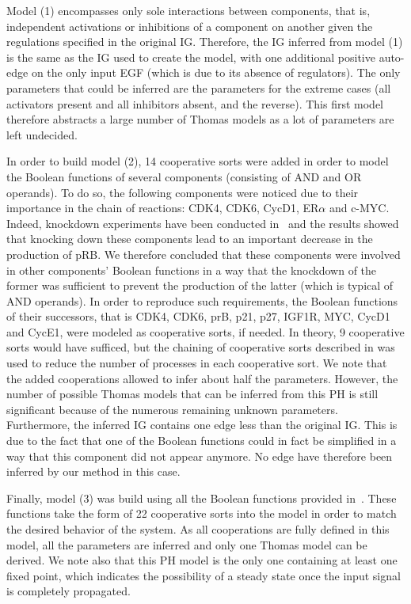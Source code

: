 Model (1) encompasses only sole interactions between components, that is,
independent activations or inhibitions of a component on another given the regulations specified in the original IG.
Therefore, the IG inferred from model (1) is the same as the IG used to create the model,
with one additional positive auto-edge on the only input EGF (which is due to its absence of regulators).
The only parameters that could be inferred are the parameters for the extreme cases
(all activators present and all inhibitors absent, and the reverse).
This first model therefore abstracts a large number of Thomas models as a lot of parameters are left undecided.

In order to build model (2), 14 cooperative sorts were added in order to model the Boolean functions of several components
(consisting of AND and OR operands).
To do so, the following components were noticed due to their importance in the chain of reactions:
CDK4, CDK6, CycD1, ER$\alpha$ and c-MYC.
Indeed, knockdown experiments have been conducted in~\cite{Sahin09}
and the results showed that knocking down these components lead to an important decrease in the production of pRB.
We therefore concluded that these components were involved in other components' Boolean functions
in a way that the knockdown of the former was sufficient to prevent the production of the latter (which is typical of AND operands).
In order to reproduce such requirements, the Boolean functions of their successors,
that is CDK4, CDK6, prB, p21, p27, IGF1R, MYC, CycD1 and CycE1,
were modeled as cooperative sorts, if needed.
In theory, 9 cooperative sorts would have sufficed, but the chaining of cooperative sorts described
in  was used to reduce the number of processes in each cooperative sort.
We note that the added cooperations allowed to infer about half the parameters.
However, the number of possible Thomas models that can be inferred from this PH is still significant
because of the numerous remaining unknown parameters.
Furthermore, the inferred IG contains one edge less than the original IG. This is due to the fact that
one of the Boolean functions could in fact be simplified in a way that this component did not appear anymore.
No edge have therefore been inferred by our method in this case.

Finally, model (3) was build using all the Boolean functions provided in~\cite{Sahin09}.
These functions take the form of 22 cooperative sorts into the model in order to match the desired behavior of the system.
As all cooperations are fully defined in this model, all the parameters are inferred and only one Thomas model can be derived.
We note also that this PH model is the only one containing at least one fixed point,
which indicates the possibility of a steady state once the input signal is completely propagated.



